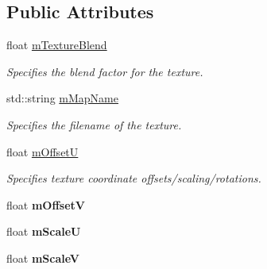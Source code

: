 \subsection*{Public Attributes}
\begin{DoxyCompactItemize}
\item 
\hypertarget{struct_assimp_1_1_d3_d_s_1_1_texture_ab6fa365dfb1d515305700098c6aece51}{float \hyperlink{struct_assimp_1_1_d3_d_s_1_1_texture_ab6fa365dfb1d515305700098c6aece51}{m\+Texture\+Blend}}\label{struct_assimp_1_1_d3_d_s_1_1_texture_ab6fa365dfb1d515305700098c6aece51}

\begin{DoxyCompactList}\small\item\em Specifies the blend factor for the texture. \end{DoxyCompactList}\item 
\hypertarget{struct_assimp_1_1_d3_d_s_1_1_texture_af2cacfd906e1550cc0b5eb95fa30aeb9}{std\+::string \hyperlink{struct_assimp_1_1_d3_d_s_1_1_texture_af2cacfd906e1550cc0b5eb95fa30aeb9}{m\+Map\+Name}}\label{struct_assimp_1_1_d3_d_s_1_1_texture_af2cacfd906e1550cc0b5eb95fa30aeb9}

\begin{DoxyCompactList}\small\item\em Specifies the filename of the texture. \end{DoxyCompactList}\item 
\hypertarget{struct_assimp_1_1_d3_d_s_1_1_texture_adba8968d9d5ce5054f71deba802c1fd6}{float \hyperlink{struct_assimp_1_1_d3_d_s_1_1_texture_adba8968d9d5ce5054f71deba802c1fd6}{m\+Offset\+U}}\label{struct_assimp_1_1_d3_d_s_1_1_texture_adba8968d9d5ce5054f71deba802c1fd6}

\begin{DoxyCompactList}\small\item\em Specifies texture coordinate offsets/scaling/rotations. \end{DoxyCompactList}\item 
\hypertarget{struct_assimp_1_1_d3_d_s_1_1_texture_a0960917289a487b4d977560e0d26b117}{float {\bfseries m\+Offset\+V}}\label{struct_assimp_1_1_d3_d_s_1_1_texture_a0960917289a487b4d977560e0d26b117}

\item 
\hypertarget{struct_assimp_1_1_d3_d_s_1_1_texture_ac4ebf0126c22ccc1d530571caecdb39b}{float {\bfseries m\+Scale\+U}}\label{struct_assimp_1_1_d3_d_s_1_1_texture_ac4ebf0126c22ccc1d530571caecdb39b}

\item 
\hypertarget{struct_assimp_1_1_d3_d_s_1_1_texture_aecc126642918a36eea8ae4d92026fce2}{float {\bfseries m\+Scale\+V}}\label{struct_assimp_1_1_d3_d_s_1_1_texture_aecc126642918a36eea8ae4d92026fce2}


\end{DoxyCompactItemize}

